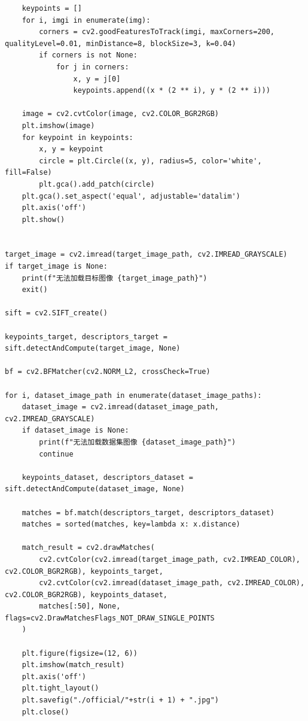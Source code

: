 \documentclass{article}
\begin{document}
\begin{lstlisting}
    keypoints = []
    for i, imgi in enumerate(img):
        corners = cv2.goodFeaturesToTrack(imgi, maxCorners=200, qualityLevel=0.01, minDistance=8, blockSize=3, k=0.04)
        if corners is not None:
            for j in corners:
                x, y = j[0]
                keypoints.append((x * (2 ** i), y * (2 ** i)))

    image = cv2.cvtColor(image, cv2.COLOR_BGR2RGB)
    plt.imshow(image)
    for keypoint in keypoints:
        x, y = keypoint
        circle = plt.Circle((x, y), radius=5, color='white', fill=False)
        plt.gca().add_patch(circle)
    plt.gca().set_aspect('equal', adjustable='datalim')
    plt.axis('off')
    plt.show()


target_image = cv2.imread(target_image_path, cv2.IMREAD_GRAYSCALE)
if target_image is None:
    print(f"无法加载目标图像 {target_image_path}")
    exit()

sift = cv2.SIFT_create()

keypoints_target, descriptors_target = sift.detectAndCompute(target_image, None)

bf = cv2.BFMatcher(cv2.NORM_L2, crossCheck=True)

for i, dataset_image_path in enumerate(dataset_image_paths):
    dataset_image = cv2.imread(dataset_image_path, cv2.IMREAD_GRAYSCALE)
    if dataset_image is None:
        print(f"无法加载数据集图像 {dataset_image_path}")
        continue

    keypoints_dataset, descriptors_dataset = sift.detectAndCompute(dataset_image, None)

    matches = bf.match(descriptors_target, descriptors_dataset)
    matches = sorted(matches, key=lambda x: x.distance)

    match_result = cv2.drawMatches(
        cv2.cvtColor(cv2.imread(target_image_path, cv2.IMREAD_COLOR), cv2.COLOR_BGR2RGB), keypoints_target,
        cv2.cvtColor(cv2.imread(dataset_image_path, cv2.IMREAD_COLOR), cv2.COLOR_BGR2RGB), keypoints_dataset,
        matches[:50], None, flags=cv2.DrawMatchesFlags_NOT_DRAW_SINGLE_POINTS
    )

    plt.figure(figsize=(12, 6))
    plt.imshow(match_result)
    plt.axis('off')
    plt.tight_layout()
    plt.savefig("./official/"+str(i + 1) + ".jpg")
    plt.close()
\end{lstlisting}
\end{document}
